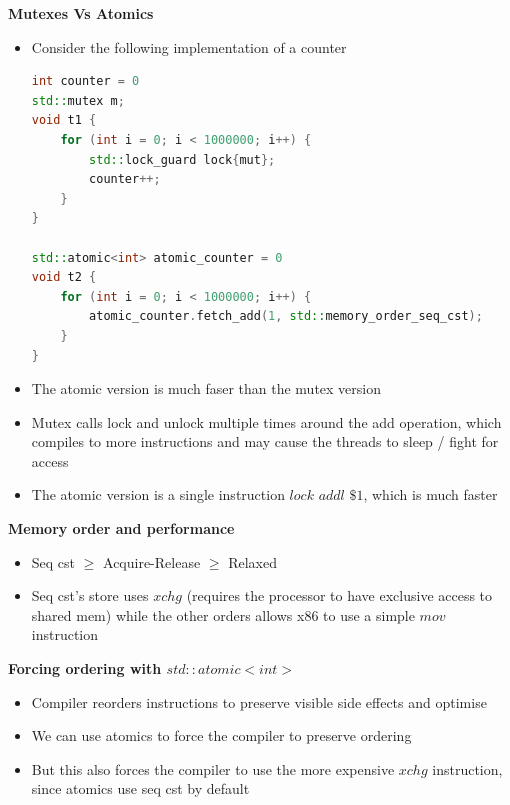 \documentclass[10pt, landscape]{article}
\begin{document}
\begin{multicols}{4}
\textbf{Mutexes Vs Atomics} \\
\begin{itemize}
    \item Consider the following implementation of a counter
    \begin{lstlisting}[language=C++, breaklines=true, breakatwhitespace=true]
int counter = 0
std::mutex m;
void t1 {
    for (int i = 0; i < 1000000; i++) {
        std::lock_guard lock{mut};
        counter++;
    }
}

std::atomic<int> atomic_counter = 0
void t2 {
    for (int i = 0; i < 1000000; i++) {
        atomic_counter.fetch_add(1, std::memory_order_seq_cst);
    }
}
    \end{lstlisting}
    \item The atomic version is much faser than the mutex version
    \item Mutex calls lock and unlock multiple times around the add operation, which compiles to more instructions and may cause the threads to sleep / fight for access
    \item The atomic version is a single instruction $lock$ $addl$ $\$1$, which is much faster
\end{itemize}

\textbf{Memory order and performance} \\ 
\begin{itemize}
    \item Seq cst $\ge$ Acquire-Release $\ge$ Relaxed
    \item Seq cst's store uses $xchg$ (requires the processor to have exclusive access to shared mem) while the other orders allows x86 to use a simple $mov$ instruction
\end{itemize}

\textbf{Forcing ordering with $std::atomic<int>$} \\
\begin{itemize}
    \item Compiler reorders instructions to preserve visible side effects and optimise 
    \item We can use atomics to force the compiler to preserve ordering
    \item But this also forces the compiler to use the more expensive $xchg$ instruction, since atomics use seq cst by default
\end{itemize}


\end{multicols}
\end{document}
